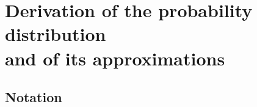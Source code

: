 \documentclass[\ifafour a4paper,12pt,\else a5paper,10pt,\fi%
onecolumn,oneside,article,%
british%
]{memoir}
\theoremstyle{remark}
\theoremstyle{innote}
\renewcommand*{\|}[1][]{\nonscript\,#1\vert\nonscript\;\mathopen{}}
\begin{document}
\clearpage
\renewcommand*{\appendixpagename}{}
 \appendix

\section{Derivation of the probability distribution\\ and of its approximations}
\label{sec:derivation}

\subsection{Notation}
\label{sec:notation}
\end{document}
